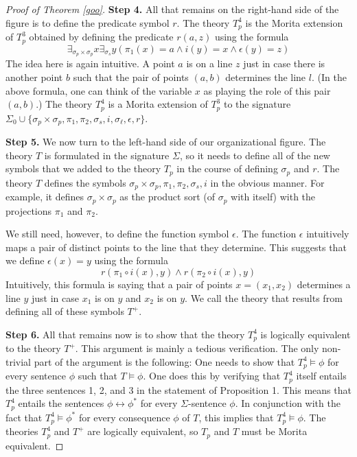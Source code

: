 \begin{proof}[Proof of Theorem \ref{goo}]
\textbf{Step 4.} All that remains on the right-hand side of the figure
is to define the predicate symbol $r$. The theory $T_p^4$ is the
Morita extension of $T_p^3$ obtained by defining the predicate
$r(a, z)$ using the formula
$$
\exists_{\sigma_p\times\sigma_p}x\exists_{\sigma_{s}}y(\pi_1(x)=a\land i(y)=x\land\epsilon(y)=z)
$$
The idea here is again intuitive. A point $a$ is on a line $z$ just in
case there is another point $b$ such that the pair of points $(a,b)$
determines the line $l$. (In the above formula, one can think of the
variable $x$ as playing the role of this pair $(a,b)$.) The theory
$T_p^4$ is a Morita extension of $T_p^3$ to the signature
$\Sigma_0\cup\{\sigma_p\times\sigma_p, \pi_1,\pi_2, \sigma_{s}, i,
\sigma_\ell, \epsilon, r\}$.

\textbf{Step 5.} We now turn to the left-hand side of our
organizational figure. The theory $T$ is formulated in the signature
$\Sigma$, so it needs to define all of the new symbols that we added
to the theory $T_p$ in the course of defining $\sigma_p$ and $r$. The
theory $T$ defines the symbols
$\sigma_p\times\sigma_p, \pi_1, \pi_2, \sigma_{s}, i$ in the obvious
manner. For example, it defines $\sigma_p\times\sigma_p$ as the
product sort (of $\sigma_p$ with itself) with the projections $\pi_1$
and $\pi_2$.

We still need, however, to define the function symbol $\epsilon$. The
function $\epsilon$ intuitively maps a pair of distinct points to the
line that they determine. This suggests that we define $\epsilon(x)=y$
using the formula
$$
r(\pi_1\circ i(x), y)\land r(\pi_2\circ i(x), y)
$$
Intuitively, this formula is saying that a pair of points $x=(x_1, x_2)$ determines a line $y$ just in case $x_1$ is on $y$ and $x_2$ is on $y$. We call the theory that results from defining all of these symbols $T^+$.

\textbf{Step 6.} All that remains now is to show that the theory
$T_p^4$ is logically equivalent to the theory $T^+$. This argument is
mainly a tedious verification. The only non-trivial part of the
argument is the following: One needs to show that $T_p^4\vDash\phi$
for every sentence $\phi$ such that $T\vDash\phi$. One does this by
verifying that $T_p^4$ itself entails the three sentences 1, 2, and 3
in the statement of Proposition 1. This means that $T_p^4$ entails the
sentences $\phi\leftrightarrow\phi^*$ for every $\Sigma$-sentence
$\phi$. In conjunction with the fact that $T_p^4\vDash\phi^*$ for
every consequence $\phi$ of $T$, this implies that
$T_p^4\vDash\phi$. The theories $T_p^4$ and $T^+$ are logically
equivalent, so $T_p$ and $T$ must be Morita equivalent.
\end{proof}

